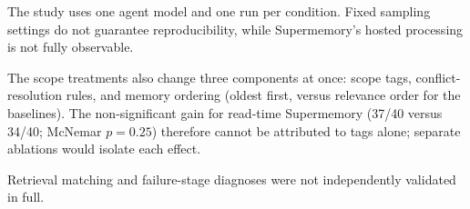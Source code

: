 The study uses one agent model and one run per
condition. Fixed sampling settings do not
guarantee reproducibility, while Supermemory's
hosted processing is not fully observable.

The scope treatments also change three components at
once: scope tags, conflict-resolution rules, and memory
ordering (oldest first, versus relevance order for the
baselines). The non-significant gain for read-time
Supermemory (37/40 versus 34/40; McNemar $p=0.25$)
therefore cannot be attributed to tags alone;
separate ablations would isolate each effect.

Retrieval matching and failure-stage diagnoses were not
independently validated in full.

